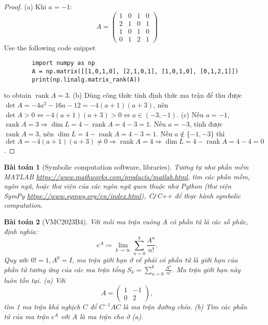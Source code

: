 \documentclass{article}
\newtheorem{baitoan}{Bài toán}
\begin{document}
\begin{proof}
	(a) Khi $a = -1$:
	\begin{equation}
		A = \begin{pmatrix}
			1 & 0 & 1 & 0\\2 & 1 & 0 & 1\\1 & 0 & 1 & 0\\0 &1 & 2 & 1
		\end{pmatrix}
	\end{equation}
	Use the following code snippet
	\begin{verbatim}
		import numpy as np
		A = np.matrix([[1,0,1,0], [2,1,0,1], [1,0,1,0], [0,1,2,1]])
		print(np.linalg.matrix_rank(A))
	\end{verbatim}
	to obtain $\operatorname{rank}A = 3$. (b) Dùng công thức tính định thức ma trận để thu được $\det A = -4a^2 - 16a - 12 = -4(a + 1)(a + 3)$, nên $\det A > 0\Leftrightarrow-4(a + 1)(a + 3) > 0\Leftrightarrow a\in(-3,-1)$. (c) Nếu $a = -1$, $\operatorname{rank}A = 3\Rightarrow\dim L = 4 - \operatorname{rank}A = 4 - 3 = 1$. Nếu $a = -3$, tính được $\operatorname{rank}A = 3$, nên $\dim L = 4 - \operatorname{rank}A = 4 - 3 = 1$. Nếu $a\notin\{-1,-3\}$ thì $\det A = -4(a + 1)(a + 3)\ne0\Rightarrow\operatorname{rank}A = 4\Rightarrow\dim L = 4 - \operatorname{rank}A = 4 - 4 = 0$.	
\end{proof}

\begin{baitoan}[Symbolic computation software, libraries]
	Tương tự như phần mềm MATLAB \url{https://www.mathworks.com/products/matlab.html}, tìm các phần mềm, ngôn ngữ, hoặc thư viện của các ngôn ngữ quen thuộc như Python (thư viện SymPy \url{https://www.sympy.org/en/index.html}), C{\tt/}C++ để thực hành symbolic computation.
\end{baitoan}

\begin{baitoan}[VMC2023B4]
	Với mỗi ma trận vuông $A$ có phần tử là các số phức, định nghĩa:
	\begin{equation*}
		e^A\coloneqq\lim_{k\to\infty} \sum_{n=0}^k \frac{A^n}{n!}.
	\end{equation*}
	Quy ước $0! = 1,A^0 = I$, ma trận giới hạn ở vế phải có phần tử là giới hạn của phần tử tương ứng của các ma trận tổng $S_k = \sum_{n=0}^k \frac{A^n}{n!}$. Ma trận giới hạn này luôn tồn tại. (a) Với
	\begin{equation*}
		A = \begin{pmatrix}
			1 & -1\\0 & 2
		\end{pmatrix},
	\end{equation*}
	tìm 1 ma trận khả nghịch $C$ để $C^{-1}AC$ là ma trận đường chéo. (b) Tìm các phần tử của ma trận $e^A$ với $A$ là ma trận cho ở (a).
\end{baitoan}
\end{document}
